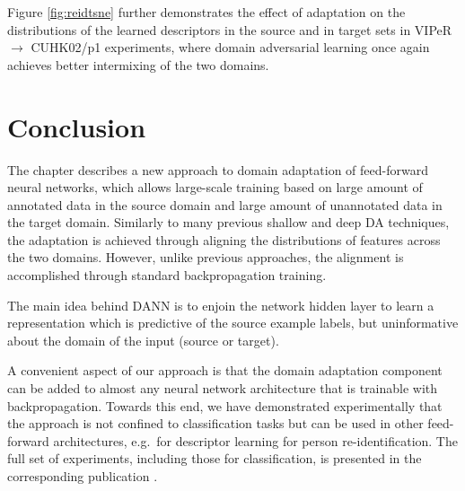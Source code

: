 Figure \ref{fig:reidtsne} further demonstrates the effect of adaptation on the distributions of the learned descriptors in the source and in target sets in VIPeR $\rightarrow$ CUHK02/p1 experiments, where domain adversarial learning once again achieves better intermixing of the two domains.


\section{Conclusion}

The chapter describes a new approach to domain adaptation of feed-forward neural networks, which allows large-scale training based on large amount of annotated data in the source domain and large amount of unannotated data in the target domain. Similarly to many previous shallow and deep DA techniques, the adaptation is achieved through aligning the distributions of features across the two domains. However, unlike previous approaches, the alignment is accomplished through standard backpropagation training.

 The main idea behind DANN is to enjoin the network hidden layer to learn a representation which is predictive of the source example labels, but uninformative about the domain of the input (source or target). 

A convenient aspect of our approach is that the domain adaptation component can be added to almost any neural network architecture that is trainable with backpropagation. Towards this end, we have demonstrated experimentally that the approach is not confined to classification tasks but can be used in other feed-forward architectures, e.g.\ for descriptor learning for person re-identification. The full set of experiments, including those for classification, is presented in the corresponding publication \citep{ganin2016domain}.


